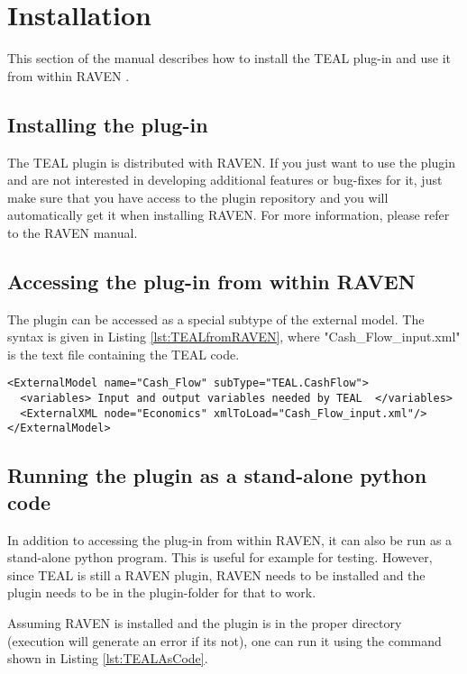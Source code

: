 \section{Installation}
\label{sec:Installation}

This section of the manual describes how to install the TEAL plug-in and use it from within RAVEN \cite{RAVEN}.

\subsection{Installing the plug-in}
The TEAL plugin is distributed with RAVEN. If you just want to use the plugin and are not interested in developing additional features or bug-fixes for it, just make sure that you have access to the plugin repository and you will automatically get it when installing RAVEN.
For more information, please refer to the RAVEN manual.

\subsection{Accessing the plug-in from within RAVEN}
The plugin can be accessed as a special subtype of the external model. The syntax is given in Listing \ref{lst:TEALfromRAVEN}, where "Cash_Flow_input.xml" is the text file containing the TEAL code.

\begin{lstlisting}[style=XML,morekeywords={anAttribute},caption=Call TEAL.CashFlow from RAVEN input., label=lst:TEALfromRAVEN]
<ExternalModel name="Cash_Flow" subType="TEAL.CashFlow">
  <variables> Input and output variables needed by TEAL  </variables>
  <ExternalXML node="Economics" xmlToLoad="Cash_Flow_input.xml"/>
</ExternalModel>
\end{lstlisting}

\subsection{Running the plugin as a stand-alone python code}

In addition to accessing the plug-in from within RAVEN, it can also be run as a stand-alone python program. This is useful for example for testing. However, since TEAL is still a RAVEN plugin, RAVEN needs to be installed and the plugin needs to be in the plugin-folder for that to work.

Assuming RAVEN is installed and the plugin is in the proper directory (execution will generate an error if its not), one can run it using the command shown in Listing \ref{lst:TEALAsCode}.

